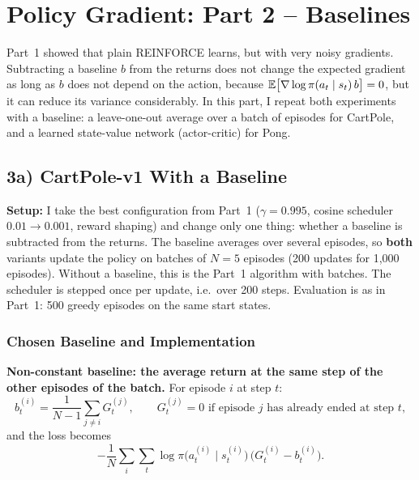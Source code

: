 \section{Policy Gradient: Part 2 -- Baselines}
\label{sec:pg2}

Part~1 showed that plain REINFORCE learns, but with very noisy gradients. Subtracting a baseline $b$ from the returns does not change the expected gradient as long as $b$ does not depend on the action, because $\mathbb{E}\big[\nabla \log \pi(a_t \mid s_t)\, b\big] = 0$, but it can reduce its variance considerably. In this part, I repeat both experiments with a baseline: a leave-one-out average over a batch of episodes for CartPole, and a learned state-value network (actor-critic) for Pong.

\subsection{3a) CartPole-v1 With a Baseline}

\textbf{Setup:} I take the best configuration from Part~1 ($\gamma = 0.995$, cosine scheduler $0.01 \to 0.001$, reward shaping) and change only one thing: whether a baseline is subtracted from the returns. The baseline averages over several episodes, so \textbf{both} variants update the policy on batches of $N = 5$ episodes (200 updates for 1,000 episodes). Without a baseline, this is the Part~1 algorithm with batches. The scheduler is stepped once per update, i.e.\ over 200 steps. Evaluation is as in Part~1: 500 greedy episodes on the same start states.

\subsubsection{Chosen Baseline and Implementation}

\textbf{Non-constant baseline: the average return at the same step of the other episodes of the batch.} For episode $i$ at step $t$:
\[
  b_t^{(i)} = \frac{1}{N-1} \sum_{j \neq i} G_t^{(j)}, \qquad G_t^{(j)} = 0 \text{ if episode } j \text{ has already ended at step } t,
\]
and the loss becomes
\[
  -\frac{1}{N} \sum_i \sum_t \log \pi\big(a_t^{(i)} \mid s_t^{(i)}\big)\,\big(G_t^{(i)} - b_t^{(i)}\big).
\]

